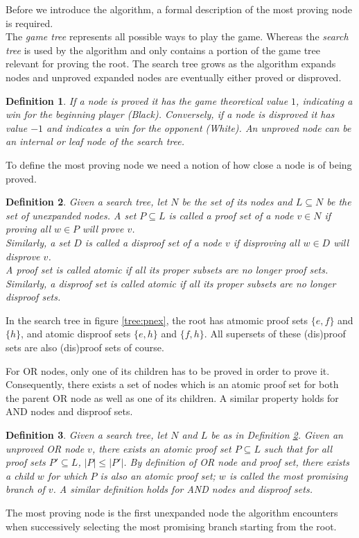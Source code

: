\documentclass{article}
\newtheorem{mydef}{Definition}
\begin{document}
Before we introduce the algorithm, a formal description of the most proving node is required.\\
The \textit{game tree} represents all possible ways to play the game. Whereas the \textit{search tree} is used by the algorithm
and only contains a portion of the game tree relevant for proving the root. The search tree grows as the algorithm expands nodes and
unproved expanded nodes are eventually either proved or disproved.
\begin{mydef}
If a node is proved it has the game theoretical value $1$, indicating a win for the beginning player (Black).
Conversely, if a node is disproved it has value $-1$ and indicates a win for the opponent (White).
An unproved node can be an internal or leaf node of the search tree.
\end{mydef}

To define the most proving node we need a notion of how close a node is of being proved.
\begin{mydef}
Given a search tree, let $N$ be the set of its nodes and $L \subseteq N$ be the set of unexpanded nodes. A set $P \subseteq L$ is called a proof set of a node $v \in N$ if proving all $w \in P$ will prove $v$.\\
Similarly, a set $D$ is called a disproof set of a node $v$ if disproving all $w \in D$ will disprove $v$.\\
A proof set is called atomic if all its proper subsets are no longer proof sets.\\
Similarly, a disproof set is called atomic if all its proper subsets are no longer disproof sets.
\label{def:pset}
\end{mydef}
In the search tree in figure \ref{tree:pnex}, the root has atmomic proof sets $\{e, f\}$ and $\{h\}$,
and atomic disproof sets $\{e, h\}$ and $\{f, h\}$. All supersets of these (dis)proof sets are also (dis)proof sets of course.

For OR nodes, only one of its children has to be proved in order to prove it. Consequently, there exists a set of nodes which is an atomic
proof set for both the parent OR node as well as one of its children. A similar property holds for AND nodes and disproof sets.
\begin{mydef}
Given a search tree, let $N$ and $L$ be as in Definition \ref{def:pset}.
Given an unproved OR node $v$, there exists an atomic proof set $P \subseteq L$ such that for all proof sets $P' \subseteq L$, $|P| \leq |P'|$.
By definition of OR node and proof set, there exists a child $w$ for which $P$ is also an atomic proof set; $w$ is called the most promising branch
of $v$. A similar definition holds for AND nodes and disproof sets.
\end{mydef}
The most proving node is the first unexpanded node the algorithm encounters when successively selecting the most promising branch starting from
the root.
\end{document}
